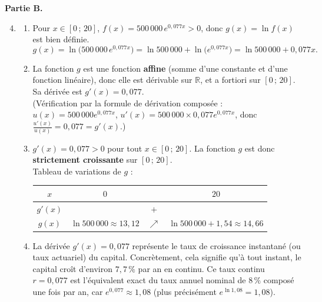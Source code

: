 \documentclass[11pt]{article}
\newcommand{\cle}[1]{{\popxbold\color{popdark}#1}}
\begin{document}
\begin{exoresolu}
\textbf{Partie B.}
\begin{enumerate}
\setcounter{enumi}{3}
\item \begin{enumerate}
\item Pour $x \in [0\,;\,20]$, $f(x) = 500\,000\, e^{0,077x} > 0$, donc $g(x) = \ln f(x)$ est bien définie.
\[ g(x) = \ln\big(500\,000\, e^{0,077x}\big) = \ln 500\,000 + \ln\big(e^{0,077x}\big) = \ln 500\,000 + 0,077x. \]
\item La fonction $g$ est une fonction \textbf{affine} (somme d'une constante et d'une fonction linéaire), donc elle est dérivable sur $\mathbb{R}$, et a fortiori sur $[0\,;\,20]$. Sa dérivée est $g'(x) = 0,077$.\\
(Vérification par la formule de dérivation composée : $u(x) = 500\,000 e^{0,077x}$, $u'(x) = 500\,000 \times 0,077 e^{0,077x}$, donc $\frac{u'(x)}{u(x)} = 0,077 = g'(x)$.)
\item $g'(x) = 0,077 > 0$ pour tout $x \in [0\,;\,20]$. La fonction $g$ est donc \textbf{strictement croissante} sur $[0\,;\,20]$.\\
Tableau de variations de $g$ :
\begin{center}
\begin{tabular}{|c|ccc|}
\hline
$x$ & $0$ & & $20$ \\ \hline
$g'(x)$ & & $+$ & \\ \hline
$g(x)$ & $\ln 500\,000 \approx 13,12$ & $\nearrow$ & $\ln 500\,000 + 1,54 \approx 14,66$ \\ \hline
\end{tabular}
\end{center}
\item La dérivée $g'(x) = 0,077$ représente le \cle{taux de croissance instantané} (ou taux actuariel) du capital. Concrètement, cela signifie qu'à tout instant, le capital croît d'environ $7,7\,\%$ par an en continu. Ce taux continu $r = 0,077$ est l'équivalent exact du taux annuel nominal de $8\,\%$ composé une fois par an, car $e^{0,077} \approx 1,08$ (plus précisément $e^{\ln 1,08} = 1,08$).
\end{enumerate}
\end{enumerate}


\end{exoresolu}
\end{document}
